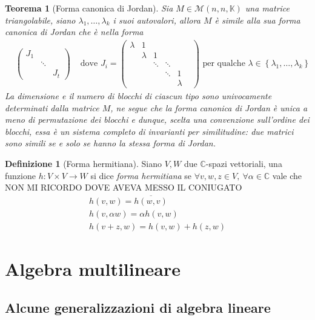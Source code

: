 \documentclass[11pt]{article}
\theoremstyle{plain}
\newtheorem{thm}{Teorema}[section]
\theoremstyle{definition}
\newtheorem{defn}{Definizione}[section]
\theoremstyle{remark}
\newcommand{\C}{\mathbb{C}}
\newcommand{\K}{\mathbb{K}}
\begin{document}
\begin{thm}[Forma canonica di Jordan]
	Sia $M\in \mathcal{M}(n,n,\K)$ una matrice triangolabile, siano $\lambda_1,\ldots,\lambda_k$ i suoi autovalori, allora $M$ è simile alla sua \textit{forma canonica di Jordan} che è nella forma
	\begin{align*}
		&\begin{pmatrix}
			J_1 & & \\
			& \ddots & \\
			& & J_t
		\end{pmatrix}		
		&\text{ dove }J_i=\begin{pmatrix}
		                  	\lambda & 1 & & & \\
							& \lambda & 1 & & \\
		                  	& & \ddots & \ddots & \\
		                  	& & & \ddots & 1 & \\
		                  	& & & & \lambda
		                  \end{pmatrix} \text{ per qualche }\lambda \in \left\{ \lambda_1,\ldots,\lambda_k \right\}
	\end{align*}
	La dimensione e il numero di blocchi di ciascun tipo sono univocamente determinati dalla matrice $M$, ne segue che la forma canonica di Jordan è unica a meno di permutazione dei blocchi e dunque, scelta una convenzione sull'ordine dei blocchi, essa è un sistema completo di invarianti per similitudine: due matrici sono simili se e solo se hanno la stessa forma di Jordan.

\end{thm}
\begin{defn}[Forma hermitiana]
Siano $V,W$ due $\C$-spazi vettoriali, una funzione $h:V\times V\to W$ si dice \textit{forma hermitiana} se $\forall v,w,z\in V,\ \forall \alpha \in \C$ vale che NON MI RICORDO DOVE AVEVA MESSO IL CONIUGATO
\begin{gather*}
	h(v,w) = \overline{h(w,v)}\\
	h(v,\alpha w) = \alpha h(v,w)\\
	h(v+z,w)=h(v,w)+h(z,w)
\end{gather*}

\end{defn}



\newpage
\section{Algebra multilineare}
\subsection{Alcune generalizzazioni di algebra lineare}
\end{document}
